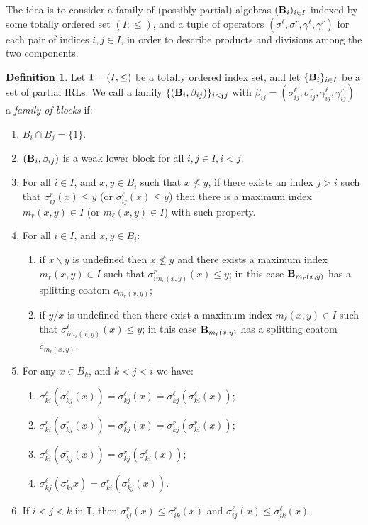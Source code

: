 \documentclass{amsart}
\theoremstyle{definition}
\newtheorem{definition}[theorem]{Definition}
\numberwithin{equation}{section}
\newcommand{\alg}[1]{{\textbf{\upshape #1}}}  %
\newcommand{\II}{{\mathbf I}} %
\newcommand{\sell}{\sigma^\ell}
\newcommand{\sr}{\sigma^r}
\newcommand{\gell}{\gamma^\ell}
\newcommand{\gr}{\gamma^r}
\newcommand{\Sell}[2]{\sigma^\ell_{#1#2}}
\newcommand{\Sellx}[3]{\sigma^\ell_{#1#2}(#3)}
\newcommand{\Gell}[2]{\gamma^\ell_{#1#2}}
\newcommand{\Sr}[2]{\sigma^r_{#1#2}}
\newcommand{\Srx}[3]{\sigma^r_{#1#2}(#3)}
\newcommand{\Gr}[2]{\gamma^r_{#1#2}}
\newcommand{\betaij}{\beta_{ij}}
\begin{document}
The idea is to consider a family of (possibly partial) algebras $(\alg B_{i})_{i \in I}$ indexed by some totally ordered set $(I; \leq)$, and a tuple of operators $(\sell, \sr,\gell, \gr)$ for each pair of indices $i,j \in I$, in order to describe products and divisions among the two components. 
\begin{definition}\label{def: (iterated) blockwise gluing}
Let ${\bf I}=(I,\leq)$ be a totally ordered index set, and let $\{\alg B_i\}_{i \in I}$ be a set of partial IRLs. We call a family $\{(\alg B_{i}, \betaij)\}_{i <_{\II} j}$ with $\betaij = (\Sell i j, \Sr i j , \Gell i j, \Gr i j)$ a \emph{family of blocks} if: 
	\begin{enumerate}
		\item $B_{i} \cap B_{j} = \{1\}$. 
		\item $(\alg B_{i}, \betaij)$ is a weak lower block for all $i,j \in I, i < j$. 
		\item For all $i \in I$, and $x,y \in B_i$ such that $x \not\leq y$, if there exists an index $j > i$ such that $\Srx i j x \leq y$ (or $\Sellx i j x \leq y$) then there is a maximum index  $m_r(x,y) \in I$ (or $m_\ell(x,y) \in I$) with such property.
		\item For all $i \in I$, and $x,y \in B_i$:
		\begin{enumerate}
	\item if $x \backslash y$ is undefined then $x \not \leq y$ and there exists a maximum index $m_r(x,y) \in I$ such that $\Srx i {m_r(x,y)} x \leq y$; in this case $\alg B_{m_r(x,y)}$ has a splitting coatom $c_{m_r(x,y)}$;
		\item if $y / x$ is undefined then there exist a maximum index $m_\ell (x,y) \in I$ such that $\Sellx i {m_\ell(x,y)} x \leq y$; in this case $\alg B_{m_\ell(x,y)}$ has a splitting coatom $c_{m_\ell(x,y)}$. 
		\end{enumerate}
		\item For any $x \in B_k$, and $k < j < i$ we have:
		\begin{enumerate}
		\item $\Sellx k i {\Sellx k j x} = \Sellx k j x = \Sellx k j {\Sellx k i x}$;
		\item $\Srx k i {\Srx k j x} = \Srx k j x = \Srx k j {\Srx k i x}$;
		\item $\Sellx k i {\Srx k j x} = \Srx k j {\Sellx k i x}$;
		\item $\Sellx k j {\Sr k i x} = \Srx k i {\Sellx k j x}$.
		\end{enumerate}
		\item If $i < j < k$ in $\alg I$, then $\Srx i j x \leq \Srx{i}{k}{x}$ and $\Sellx i j x \leq \Sellx{i}{k}{x}$. 

\end{enumerate}
\end{definition}
\end{document}
